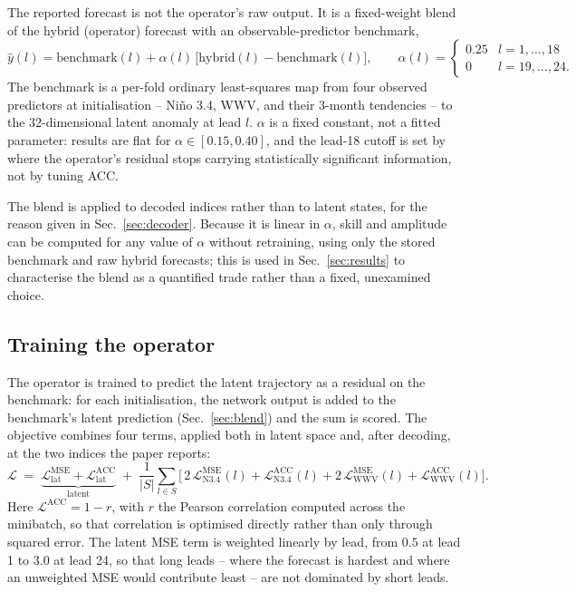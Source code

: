 The reported forecast is not the operator's raw output. It is a fixed-weight blend of the
hybrid (operator) forecast with an observable-predictor benchmark,
\[
\hat y(l) = \mathrm{benchmark}(l) + \alpha(l)\,\bigl[\mathrm{hybrid}(l) -
\mathrm{benchmark}(l)\bigr], \qquad
\alpha(l) = \begin{cases} 0.25 & l = 1,\dots,18 \\ 0 & l = 19,\dots,24. \end{cases}
\]
The benchmark is a per-fold ordinary least-squares map from four observed predictors at
initialisation -- Ni\~no 3.4, WWV, and their 3-month tendencies -- to the 32-dimensional latent
anomaly at lead $l$. $\alpha$ is a fixed constant, not a fitted parameter: results are flat for
$\alpha\in[0.15,0.40]$, and the lead-18 cutoff is set by where the operator's residual stops
carrying statistically significant information, not by tuning ACC.

The blend is applied to decoded indices rather than to latent states, for the reason given in
Sec.~\ref{sec:decoder}. Because it is linear in $\alpha$, skill and amplitude can be computed
for any value of $\alpha$ without retraining, using only the stored benchmark and raw hybrid
forecasts; this is used in Sec.~\ref{sec:results} to characterise the blend as a quantified
trade rather than a fixed, unexamined choice.

\subsection{Training the operator}
\label{sec:training}

The operator is trained to predict the latent trajectory as a residual on the benchmark: for
each initialisation, the network output is added to the benchmark's latent prediction
(Sec.~\ref{sec:blend}) and the sum is scored. The objective combines four terms, applied both
in latent space and, after decoding, at the two indices the paper reports:
\[
\mathcal{L} \;=\;
\underbrace{\mathcal{L}^{\mathrm{MSE}}_{\mathrm{lat}}
+ \mathcal{L}^{\mathrm{ACC}}_{\mathrm{lat}}}_{\text{latent}}
\;+\; \frac{1}{|S|}\sum_{l\in S}
\Big[\,2\,\mathcal{L}^{\mathrm{MSE}}_{\mathrm{N3.4}}(l)
+ \mathcal{L}^{\mathrm{ACC}}_{\mathrm{N3.4}}(l)
+ 2\,\mathcal{L}^{\mathrm{MSE}}_{\mathrm{WWV}}(l)
+ \mathcal{L}^{\mathrm{ACC}}_{\mathrm{WWV}}(l)\Big].
\]
Here $\mathcal{L}^{\mathrm{ACC}} = 1 - r$, with $r$ the Pearson correlation computed across the
minibatch, so that correlation is optimised directly rather than only through squared error.
The latent MSE term is weighted linearly by lead, from $0.5$ at lead 1 to $3.0$ at lead 24, so
that long leads -- where the forecast is hardest and where an unweighted MSE would contribute
least -- are not dominated by short leads.

